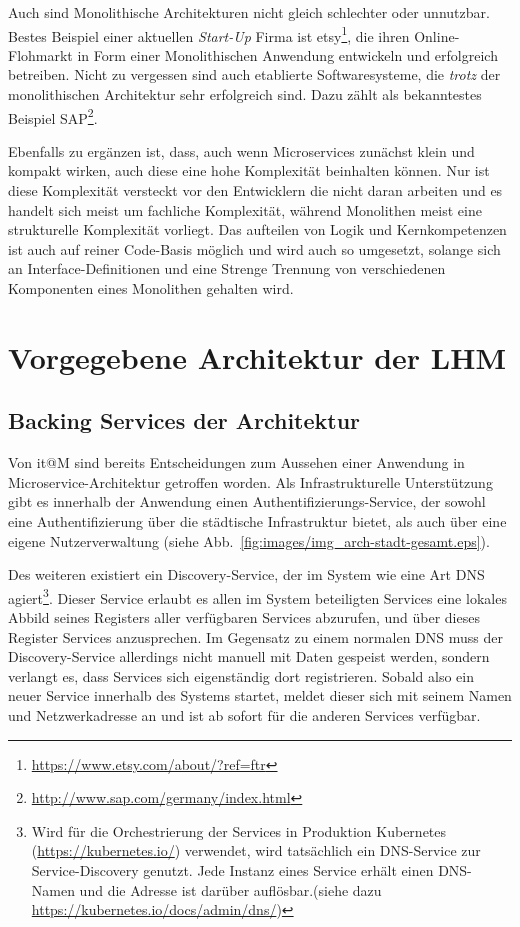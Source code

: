 \documentclass[12pt,a4paper,bibliography=totocnumbered,listof=totocnumbered]{scrartcl}
\begin{document}
Auch sind Monolithische Architekturen nicht gleich schlechter oder unnutzbar. Bestes Beispiel einer aktuellen \textit{Start-Up} Firma ist etsy\footnote{\url{https://www.etsy.com/about/?ref=ftr}}, die ihren Online-Flohmarkt in Form einer Monolithischen Anwendung entwickeln und erfolgreich betreiben. Nicht zu vergessen sind auch etablierte Softwaresysteme, die \textit{trotz} der monolithischen Architektur sehr erfolgreich sind. Dazu zählt als bekanntestes Beispiel SAP\footnote{\url{http://www.sap.com/germany/index.html}}.

Ebenfalls zu ergänzen ist, dass, auch wenn Microservices zunächst klein und kompakt wirken, auch diese eine hohe Komplexität beinhalten können. Nur ist diese Komplexität versteckt vor den Entwicklern die nicht daran arbeiten und es handelt sich meist um fachliche Komplexität, während Monolithen meist eine strukturelle Komplexität vorliegt. Das aufteilen von Logik und Kernkompetenzen ist auch auf reiner Code-Basis möglich und wird auch so umgesetzt, solange sich an Interface-Definitionen und eine Strenge Trennung von verschiedenen Komponenten eines Monolithen gehalten wird.\cite{hoff}

\section{Vorgegebene Architektur der \acf{LHM}}\label{ch:arch-itm}

\subsection{Backing Services der Architektur}

Von it@M sind bereits Entscheidungen zum Aussehen einer Anwendung in Microservice-Architektur getroffen worden. Als Infrastrukturelle Unterstützung gibt es innerhalb der Anwendung einen Authentifizierungs-Service, der sowohl eine Authentifizierung über die städtische Infrastruktur bietet, als auch über eine eigene Nutzerverwaltung (siehe Abb.~\ref{fig:images/img_arch-stadt-gesamt.eps}).

Des weiteren existiert ein Discovery-Service, der im System wie eine Art \acs{DNS} agiert\footnote{Wird für die Orchestrierung der Services in Produktion Kubernetes (\url{https://kubernetes.io/}) verwendet, wird tatsächlich ein DNS-Service zur Service-Discovery genutzt. Jede Instanz eines Service erhält einen DNS-Namen und die Adresse ist darüber auflösbar.(siehe dazu \url{https://kubernetes.io/docs/admin/dns/})}. Dieser Service erlaubt es allen im System beteiligten Services eine lokales Abbild seines Registers aller verfügbaren Services abzurufen, und über dieses Register Services anzusprechen. Im Gegensatz zu einem normalen \ac{DNS} muss der Discovery-Service allerdings nicht manuell mit Daten gespeist werden, sondern verlangt es, dass Services sich eigenständig dort registrieren. Sobald also ein neuer Service innerhalb des Systems startet, meldet dieser sich mit seinem Namen und Netzwerkadresse an und ist ab sofort für die anderen Services verfügbar.
\end{document}
